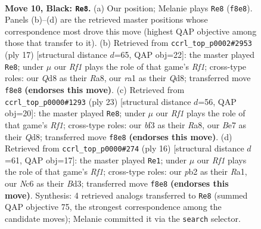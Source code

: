 \documentclass[11pt]{article}
\begin{document}
\clearpage

\begin{figure}[p]\centering
\begin{subfigure}{0.46\textwidth}\centering
\resizebox{\linewidth}{!}{%
\newchessgame
\chessboard[
  setfen={r1bq1rk1/ppp1bp1p/2n1p1p1/3n4/2NP4/4PBP1/PP3P1P/RNBQ1RK1 b - - 2 10},
  showmover=false,
  pgfstyle=straightmove, color=movearrow, markmove={f8-e8}
]}
\caption{}
\end{subfigure}\hfill
\begin{subfigure}{0.46\textwidth}\centering
\resizebox{\linewidth}{!}{%
\newchessgame
\chessboard[
  setfen={r1bq1rk1/ppp1bppp/1nnp4/8/2PP4/5N1P/PP2BPP1/RNBQ1RK1 b - - 0 9},
  showmover=false,
  pgfstyle=straightmove, color=movearrow, markmove={f8-e8}
]}
\caption{}
\end{subfigure}
\\[4pt]
\begin{subfigure}{0.46\textwidth}\centering
\resizebox{\linewidth}{!}{%
\newchessgame
\chessboard[
  setfen={r1bq1rk1/ppp2pp1/2nb3p/3p1n2/P2P4/2P2N1P/1P3PP1/RNBQRBK1 b - - 0 12},
  showmover=false,
  pgfstyle=straightmove, color=movearrow, markmove={f8-e8}
]}
\caption{}
\end{subfigure}\hfill
\begin{subfigure}{0.46\textwidth}\centering
\resizebox{\linewidth}{!}{%
\newchessgame
\chessboard[
  setfen={rqb1kbnr/3p1ppp/p1n1p3/1p6/4P3/2NB1N2/PPP2PPP/R1BQ1RK1 w kq - 6 9},
  showmover=false,
  pgfstyle=straightmove, color=movearrow, markmove={f1-e1}
]}
\caption{}
\end{subfigure}
\caption{\textbf{Move 10, Black: \texttt{Re8}.} (a) Our position; Melanie plays \texttt{Re8} (\texttt{f8e8}). Panels (b)--(d) are the retrieved master positions whose correspondence most drove this move (highest QAP objective among those that transfer to it). (b) Retrieved from \texttt{ccrl\_top\_p0002\#2953} (ply 17) [structural distance $d$=65, QAP obj=22]: the master played \texttt{Re8}; under $\mu$ our \emph{Rf1} plays the role of that game's \emph{Rf1}; cross-type roles: our \emph{Q}d8 as their \emph{R}a8, our \emph{r}a1 as their \emph{Q}d8; transferred move \texttt{f8e8} \textbf{(endorses this move)}. (c) Retrieved from \texttt{ccrl\_top\_p0000\#1293} (ply 23) [structural distance $d$=56, QAP obj=20]: the master played \texttt{Re8}; under $\mu$ our \emph{Rf1} plays the role of that game's \emph{Rf1}; cross-type roles: our \emph{b}f3 as their \emph{R}a8, our \emph{B}e7 as their \emph{Q}d8; transferred move \texttt{f8e8} \textbf{(endorses this move)}. (d) Retrieved from \texttt{ccrl\_top\_p0000\#274} (ply 16) [structural distance $d$=61, QAP obj=17]: the master played \texttt{Re1}; under $\mu$ our \emph{Rf1} plays the role of that game's \emph{Rf1}; cross-type roles: our \emph{p}b2 as their \emph{R}a1, our \emph{N}c6 as their \emph{B}d3; transferred move \texttt{f8e8} \textbf{(endorses this move)}. Synthesis: 4 retrieved analogs transferred to \texttt{Re8} (summed QAP objective 75, the strongest correspondence among the candidate moves); Melanie committed it via the \texttt{search} selector.}
\label{fig:thought-m19}
\end{figure}
\end{document}

